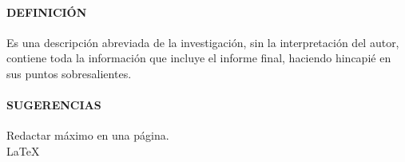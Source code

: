\paragraph{DEFINICI\'{O}N}
Es una descripci\'{o}n abreviada de la investigaci\'{o}n, sin la interpretaci\'{o}n del autor, contiene toda la informaci\'{o}n que incluye el informe final, haciendo hincapi\'{e} en sus puntos sobresalientes.

\paragraph{SUGERENCIAS}
Redactar m\'{a}ximo en una p\'{a}gina.\\

\LaTeX